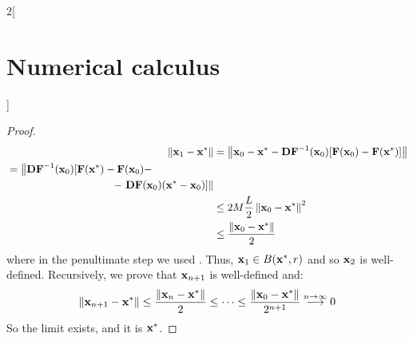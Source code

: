 \documentclass[../../../main_math.tex]{subfiles}
\begin{document}
\begin{multicols}{2}[\section{Numerical calculus}]
\begin{proof}
    \begin{align*}
      \norm{\vf{x}_1-\vf{x}^*} & = \norm{\vf{x}_0-\vf{x}^*-\vf{DF}^{-1}(\vf{x}_0)[\vf{F}(\vf{x}_0) - \vf{F}(\vf{x}^*)]} \\
      \begin{split}
        & =\left\|\vf{DF}^{-1}(\vf{x}_0)[\vf{F}(\vf{x}^*)-\vf{F}(\vf{x}_0)-\right.\\
            &\hspace{3.5cm}-\left.\vf{DF}(\vf{x}_0)(\vf{x}^*-\vf{x}_0)]\right\| \\
      \end{split}                           \\
                               & \leq 2M \frac{L}{2} \norm{\vf{x}_0-\vf{x}^*}^2                                         \\
                               & \leq \frac{\norm{\vf{x}_0-\vf{x}^*}}{2}
    \end{align*}
    where in the penultimate step we used . Thus, $\boldsymbol{\mathrm{x}}_1\in B(\boldsymbol{\mathrm{x}}^*,r)$ and so $\boldsymbol{\mathrm{x}}_2$ is well-defined. Recursively, we prove that $\boldsymbol{\mathrm{x}}_{n+1}$ is well-defined and:
    $$
      \left\|\boldsymbol{\mathrm{x}}_{n+1}-\boldsymbol{\mathrm{x}}^*\right\|\leq \frac{\left\|\boldsymbol{\mathrm{x}}_n-\boldsymbol{\mathrm{x}}^*\right\|}{2}\leq\cdots \leq \frac{\left\|\boldsymbol{\mathrm{x}}_0-\boldsymbol{\mathrm{x}}^*\right\|}{2^{n+1}}\overset{n\to\infty}{\longrightarrow}0
    $$
    So the limit exists, and it is $\boldsymbol{\mathrm{x}}^*$.
  \end{proof}

\end{multicols}
\end{document}
